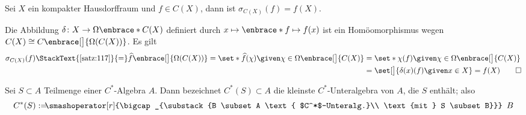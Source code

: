 \begin{bemerkung}[label=bem217,{name=[Spektrum von $f \in C(X)$ für $X$ kompakt]}]
	Sei $X$ ein kompakter Hausdorffraum und $f \in C(X)$, dann ist $\sigma_{C(X)}(f)=f(X)$.
\end{bemerkung}
\begin{beweis}
	Die Abbildung $\delta \colon X \to \Omega\enbrace*{C(X)}$ definiert durch $x \mapsto \enbrace*{f \mapsto f(x)}$ ist ein Homöomorphismus wegen $C(X) \cong C \enbrace[\big]{\Omega(C(X))}$. 
	Es gilt
	\begin{align}
		\sigma_{C(X)}(f) \StackText{\ref{satz:117}}{=} \widehat{f} \enbrace[\big]{\Omega(C(X))} = \set*{\widehat{f}(\chi) \given \chi \in \Omega \enbrace[\big]{C(X)}} 
		&= \set*{\chi(f) \given \chi \in \Omega \enbrace[\big]{C(X)}} \\
		&= \set[\big]{\delta(x)(f) \given x \in X} = f(X) \qedhere
	\end{align}
\end{beweis}

\begin{definition}[{name=[erzeuge C*-Algebra]}]
	Sei $S \subset A$ Teilmenge einer $C^*$-Algebra $A$.
	Dann bezeichnet $C^*(S) \subset A$ die kleinste $C^*$-Unteralgebra von $A$, die $S$ enthält; also
	\[
		C^*(S) := \hspace{-1.3ex} \smashoperator[r]{\bigcap_{\substack{B \subset A \text{ $C^*$-Unteralg.}\\ \text{mit } S \subset B}}} \enspace B
	\]
\end{definition}

